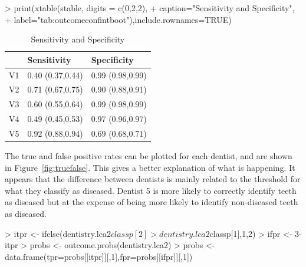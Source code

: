 \begin{Schunk}
\begin{Sinput}
> print(xtable(stable, digits = c(0,2,2),
+ 	caption="Sensitivity and Specificity",
+ 	label="tab:outcomeconfintboot"),include.rownames=TRUE)
\end{Sinput}
\begin{table}[ht]
\centering
\begin{tabular}{rll}
  \hline
 & Sensitivity & Specificity \\ 
  \hline
V1 & 0.40 (0.37,0.44) & 0.99 (0.98,0.99) \\ 
  V2 & 0.71 (0.67,0.75) & 0.90 (0.88,0.91) \\ 
  V3 & 0.60 (0.55,0.64) & 0.99 (0.98,0.99) \\ 
  V4 & 0.49 (0.45,0.53) & 0.97 (0.96,0.97) \\ 
  V5 & 0.92 (0.88,0.94) & 0.69 (0.68,0.71) \\ 
   \hline
\end{tabular}
\caption{Sensitivity and Specificity} 
\label{tab:outcomeconfintboot}
\end{table}\end{Schunk}


The true and false positive rates can be plotted for each dentist, and are shown in Figure~\ref{fig:truefalse}. This gives a better explanation of what is happening. It appears that the difference between dentists is mainly related to the threshold for what they classify as diseased. Dentist 5 is more likely to correctly identify teeth as diseased but at the expense of being more likely to identify non-diseased teeth as diseased.

\begin{Schunk}
\begin{Sinput}
> itpr <- ifelse(dentistry.lca2$classp[2]>dentistry.lca2$classp[1],1,2)
> ifpr <- 3-itpr
> probs <- outcome.probs(dentistry.lca2)
> probs <- data.frame(tpr=probs[[itpr]][,1],fpr=probs[[ifpr]][,1])
\end{Sinput}
\end{Schunk}

